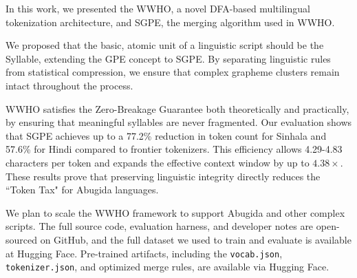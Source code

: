In this work, we presented the WWHO, a novel DFA-based multilingual tokenization architecture, and SGPE, the merging algorithm used in WWHO.

We proposed that the basic, atomic unit of a linguistic script should be the Syllable, extending the GPE concept to SGPE. By separating linguistic rules from statistical compression, we ensure that complex grapheme clusters remain intact throughout the process.

WWHO satisfies the Zero-Breakage Guarantee both theoretically and practically, by ensuring that meaningful syllables are never fragmented. Our evaluation shows that SGPE achieves up to a 77.2\% reduction in token count for Sinhala and 57.6\% for Hindi compared to frontier tokenizers. This efficiency allows 4.29-4.83 characters per token and expands the effective context window by up to $4.38\times$. These results prove that preserving linguistic integrity directly reduces the ``Token Tax" for Abugida languages.

We plan to scale the WWHO framework to support Abugida and other complex scripts. The full source code, evaluation harness, and developer notes are open-sourced on GitHub\cite{wwho2026code}, and the full dataset we used to train and evaluate is available at Hugging Face\cite{wwho30m}. Pre-trained artifacts, including the \texttt{vocab.json}, \texttt{tokenizer.json}, and optimized merge rules, are available via Hugging Face\cite{wwho2026tokenizer}.